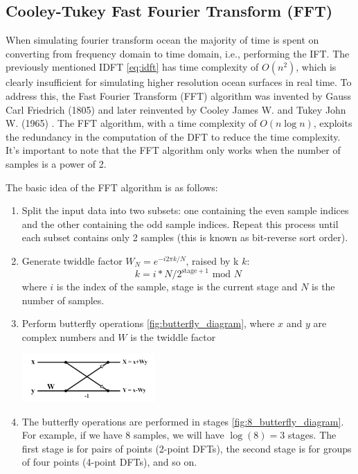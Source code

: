 \subsection{Cooley-Tukey Fast Fourier Transform (FFT)}
When simulating fourier transform ocean the majority of time is spent on converting from frequency domain to time domain, i.e., performing the IFT.
The previously mentioned IDFT \ref{eq:idft} has time complexity of $O(n^2)$, which is clearly insufficient for simulating higher resolution ocean surfaces in real time.
To address this, the Fast Fourier Transform (FFT) algorithm was invented by Gauss Carl Friedrich (1805) \cite{gauss1866} and later reinvented by Cooley James W. and Tukey John W. (1965) \cite{cooley1965}. 
The FFT algorithm, with a time complexity of $O(n\log n)$, exploits the redundancy in the computation of the DFT to reduce the time complexity. It's important to note that the FFT algorithm only works when the number of samples is a power of 2.

The basic idea of the FFT algorithm is as follows:
\begin{enumerate}
    \item Split the input data into two subsets: one containing the even sample indices and the other containing the odd sample indices. Repeat this process until each subset contains only 2 samples (this is known as bit-reverse sort order).
    \item Generate twiddle factor $W_N = e^{-i 2 \pi k / N}$, raised by k $k$:\\
    \begin{equation}
        k = i * N / 2^{\text{stage} + 1} \text{ mod } N
    \end{equation}
    where $i$ is the index of the sample, stage is the current stage and $N$ is the number of samples.
    \item Perform butterfly operations \ref{fig:butterfly_diagram}, where $x$ and $y$ are complex numbers and $W$ is the twiddle factor

    \begin{minipage}{1\textwidth}
        \centering
        \includegraphics[width=0.4\textwidth]{"images/butterfly_diagram.png"}
        \label{fig:butterfly_diagram}
    \end{minipage}

    \item The butterfly operations are performed in stages \ref{fig:8_butterfly_diagram}. For example, if we have 8 samples, we will have $\log(8) = 3 $ stages. The first stage is for pairs of points (2-point DFTs), the second stage is for groups of four points (4-point DFTs), and so on.
\end{enumerate}

